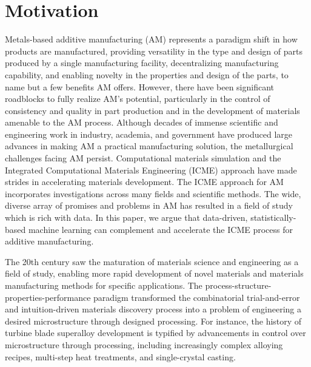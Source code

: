 \section{Motivation}

Metals-based additive manufacturing (AM) represents a paradigm shift in how products are manufactured, providing versatility in the type and design of parts produced by a single manufacturing facility, decentralizing manufacturing capability, and enabling novelty in the properties and design of the parts, to name but a few benefits AM offers. However, there have been significant roadblocks to fully realize AM's potential, particularly in the control of consistency and quality in part production and in the development of materials amenable to the AM process. Although decades of immense scientific and engineering work in industry, academia, and government have produced large advances in making AM a practical manufacturing solution, the metallurgical challenges facing AM persist. Computational materials simulation and the Integrated Computational Materials Engineering (ICME) approach have made strides in accelerating materials development. The ICME approach for AM incorporates investigations across many fields and scientific methods. The wide, diverse array of promises and problems in AM has resulted in a field of study which is rich with data. In this paper, we argue that data-driven, statistically-based machine learning can complement and accelerate the ICME process for additive manufacturing. 


The 20th century saw the maturation of materials science and engineering as a field of study, enabling more rapid development of novel materials and materials manufacturing methods for specific applications. The process-structure-properties-performance paradigm transformed the combinatorial trial-and-error and intuition-driven materials discovery process into a problem of engineering a desired microstructure through designed processing. For instance, the history of turbine blade superalloy development is typified by advancements in control over microstructure through processing, including increasingly complex alloying recipes, multi-step heat treatments, and single-crystal casting. 

